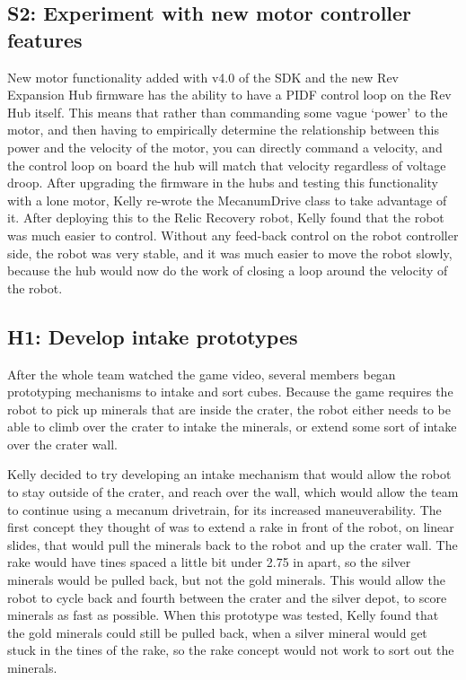 \documentclass{article}
\begin{document}
\subsection{S2: Experiment with new motor controller features}

New motor functionality added with v4.0 of the SDK and the new Rev Expansion Hub firmware has the ability to have a PIDF control loop on the Rev Hub itself. This means that rather than commanding some vague `power' to the motor, and then having to empirically determine the relationship between this power and the velocity of the motor, you can directly command a velocity, and the control loop on board the hub will match that velocity regardless of voltage droop. After upgrading the firmware in the hubs and testing this functionality with a lone motor, Kelly re-wrote the MecanumDrive class to take advantage of it. After deploying this to the Relic Recovery robot, Kelly found that the robot was much easier to control. Without any feed-back control on the robot controller side, the robot was very stable, and it was much easier to move the robot slowly, because the hub would now do the work of closing a loop around the velocity of the robot.\subsection{H1: Develop intake prototypes}

After the whole team watched the game video, several members began prototyping mechanisms to intake and sort cubes. Because the game requires the robot to pick up minerals that are inside the crater, the robot either needs to be able to climb over the crater to intake the minerals, or extend some sort of intake over the crater wall. 

Kelly decided to try developing an intake mechanism that would allow the robot to stay outside of the crater, and reach over the wall, which would allow the team to continue using a mecanum drivetrain, for its increased maneuverability. The first concept they thought of was to extend a rake in front of the robot, on linear slides, that would pull the minerals back to the robot and up the crater wall. The rake would have tines spaced a little bit under 2.75 in apart, so the silver minerals would be pulled back, but not the gold minerals. This would allow the robot to cycle back and fourth between the crater and the silver depot, to score minerals as fast as possible. When this prototype was tested, Kelly found that the gold minerals could still be pulled back, when a silver mineral would get stuck in the tines of the rake, so the rake concept would not work to sort out the minerals. 
\end{document}
